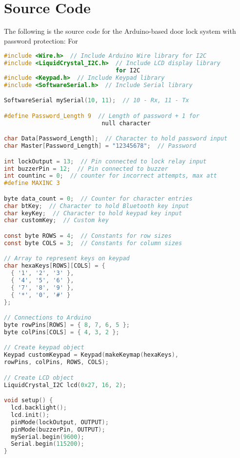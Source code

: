 \documentclass[a4paper, 12pt]{article}
\begin{document}
\appendix
\section{Source Code}

The following is the source code for the Arduino-based door lock system with password protection:
For 

\begin{lstlisting}[language=C,caption={Arduino Source Code for Password Protected Door Lock},label={lst:source_code},basicstyle=\small\ttfamily]
#include <Wire.h>  // Include Arduino Wire library for I2C
#include <LiquidCrystal_I2C.h>  // Include LCD display library 
                                for I2C
#include <Keypad.h>  // Include Keypad library
#include <SoftwareSerial.h>  // Include Serial library

SoftwareSerial mySerial(10, 11);  // 10 - Rx, 11 - Tx

#define Password_Length 9  // Length of password + 1 for 
                            null character

char Data[Password_Length];  // Character to hold password input
char Master[Password_Length] = "12345678";  // Password

int lockOutput = 13;  // Pin connected to lock relay input
int buzzerPin = 12;  // Pin connected to buzzer
int countinc = 0;  // counter for incorrect attempts, max att
#define MAXINC 3

byte data_count = 0;  // Counter for character entries
char btKey;  // Character to hold Bluetooth key input
char keyKey;  // Character to hold keypad key input
char customKey;  // Custom key

const byte ROWS = 4;  // Constants for row sizes
const byte COLS = 3;  // Constants for column sizes

// Array to represent keys on keypad
char hexaKeys[ROWS][COLS] = {
  { '1', '2', '3' },
  { '4', '5', '6' },
  { '7', '8', '9' },
  { '*', '0', '#' }
};

// Connections to Arduino
byte rowPins[ROWS] = { 8, 7, 6, 5 };
byte colPins[COLS] = { 4, 3, 2 };

// Create keypad object
Keypad customKeypad = Keypad(makeKeymap(hexaKeys), 
rowPins, colPins, ROWS, COLS);

// Create LCD object
LiquidCrystal_I2C lcd(0x27, 16, 2);

void setup() {
  lcd.backlight();
  lcd.init();
  pinMode(lockOutput, OUTPUT);
  pinMode(buzzerPin, OUTPUT);
  mySerial.begin(9600);
  Serial.begin(115200);
}


\end{lstlisting}
\end{document}
